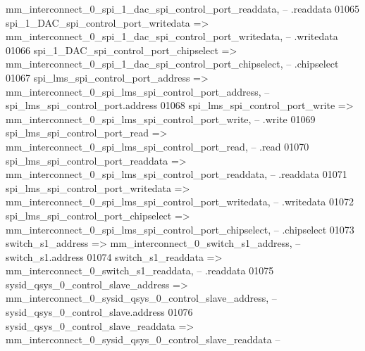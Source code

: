 \begin{DoxyCode}
      mm_interconnect_0_spi_1_dac_spi_control_port_readdata,\textcolor{keyword}{       --                                     
       .readdata}
01065             spi\_1\_DAC\_spi\_control\_port\_writedata        => 
      mm_interconnect_0_spi_1_dac_spi_control_port_writedata,\textcolor{keyword}{      --                                     
       .writedata}
01066             spi\_1\_DAC\_spi\_control\_port\_chipselect       => 
      mm_interconnect_0_spi_1_dac_spi_control_port_chipselect,\textcolor{keyword}{     --                                     
       .chipselect}
01067             spi\_lms\_spi\_control\_port\_address            => 
      mm_interconnect_0_spi_lms_spi_control_port_address,\textcolor{keyword}{          --             
       spi\_lms\_spi\_control\_port.address}
01068             spi\_lms\_spi\_control\_port\_write              => 
      mm_interconnect_0_spi_lms_spi_control_port_write,\textcolor{keyword}{            --                                      .write}
01069             spi\_lms\_spi\_control\_port\_read               => 
      mm_interconnect_0_spi_lms_spi_control_port_read,\textcolor{keyword}{             --                                      .read}
01070             spi\_lms\_spi\_control\_port\_readdata           => 
      mm_interconnect_0_spi_lms_spi_control_port_readdata,\textcolor{keyword}{         --                                     
       .readdata}
01071             spi\_lms\_spi\_control\_port\_writedata          => 
      mm_interconnect_0_spi_lms_spi_control_port_writedata,\textcolor{keyword}{        --                                     
       .writedata}
01072             spi\_lms\_spi\_control\_port\_chipselect         => 
      mm_interconnect_0_spi_lms_spi_control_port_chipselect,\textcolor{keyword}{       --                                     
       .chipselect}
01073             switch\_s1\_address                           => 
      mm_interconnect_0_switch_s1_address,\textcolor{keyword}{                         --                            
       switch\_s1.address}
01074             switch\_s1\_readdata                          => 
      mm_interconnect_0_switch_s1_readdata,\textcolor{keyword}{                        --                                     
       .readdata}
01075             sysid\_qsys\_0\_control\_slave\_address          => 
      mm_interconnect_0_sysid_qsys_0_control_slave_address,\textcolor{keyword}{        --           
       sysid\_qsys\_0\_control\_slave.address}
01076             sysid\_qsys\_0\_control\_slave\_readdata         => 
      mm_interconnect_0_sysid_qsys_0_control_slave_readdata        \textcolor{keyword}{--                                     
}
\end{DoxyCode}
